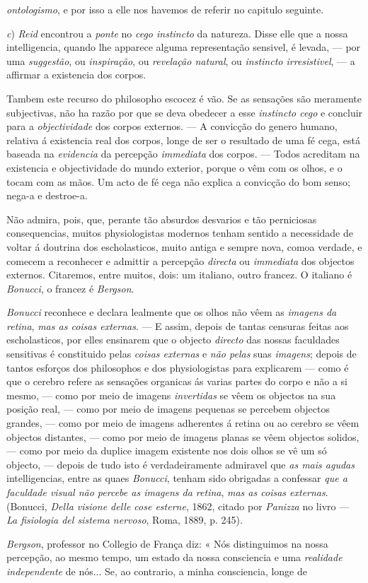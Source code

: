 \emph{ontologismo}, e por isso a elle nos havemos de referir no capitulo seguinte.\par \emph{c}) \emph{Reid} encontrou a \emph{ponte} no \emph{cego instincto} da natureza. Disse elle que a nossa intelligencia, quando lhe apparece alguma representação sensivel, é levada, --- por uma \emph{suggestão}, ou \emph{inspiração}, ou \emph{revelação natural}, ou \emph{instincto irresistivel}, --- a affirmar a existencia dos corpos.\par Tambem este recurso do philosopho escocez é vão. Se as sensações são meramente subjectivas, não ha razão por que se deva obedecer a esse \emph{instincto cego} e concluir para a \emph{objectividade} dos corpos externos. --- A convicção do genero humano, relativa á existencia real dos corpos, longe de ser o resultado de uma fé cega, está baseada na \emph{evidencia} da percepção \emph{immediata} dos corpos. --- Todos acreditam na existencia e objectividade do mundo exterior, porque o vêm com os olhos, e o tocam com as mãos. Um acto de fé cega não explica a convicção do bom senso; nega-a e destroe-a.\par *\par Não admira, pois, que, perante tão absurdos desvarios e tão perniciosas consequencias, muitos physiologistas modernos tenham sentido a necessidade de voltar á doutrina dos escholasticos, muito antiga e sempre nova, comoa verdade, e comecem a reconhecer e admittir a percepção \emph{directa} ou \emph{immediata} dos objectos externos. Citaremos, entre muitos, dois: um italiano, outro francez. O italiano é \emph{Bonucci}, o francez é \emph{Bergson}.\par \emph{Bonucci} reconhece e declara lealmente que os olhos não vêem as \emph{imagens da retina}, \emph{mas as coisas externas}. --- E assim, depois de tantas censuras feitas aos escholasticos, por elles ensinarem que o objecto \emph{directo} das nossas faculdades sensitivas é constituido pelas \emph{coisas externas} e \emph{não pelas} suas \emph{imagens}; depois de tantos esforços dos philosophos e dos physiologistas para explicarem --- como é que o cerebro refere as sensações organicas ás varias partes do corpo e não a si mesmo, --- como por meio de imagens \emph{invertidas} se vêem os objectos na sua posição real, --- como por meio de imagens pequenas se percebem objectos grandes, --- como por meio de imagens adherentes á retina ou ao cerebro se vêem objectos distantes, --- como por meio de imagens planas se vêem objectos solidos, --- como por meio da duplice imagem existente nos dois olhos se vê um só objecto, --- depois de tudo isto é verdadeiramente admiravel que \emph{as mais agudas} intelligencias, entre as quaes \emph{Bonucci}, tenham sido obrigadas a confessar \emph{que a faculdade visual não percebe as imagens da retina}, \emph{mas as coisas externas}. (Bonucci, \emph{Della visione delle cose esterne}, 1862, citado por \emph{Panizza} no livro --- \emph{La fisiologia del sistema nervoso}, Roma, 1889, p. 245).\par \emph{Bergson}, professor no Collegio de França diz: « Nós distinguimos na nossa percepção, ao mesmo tempo, um estado da nossa consciencia e uma \emph{realidade independente} de nós... Se, ao contrario, a minha consciencia, longe de 
